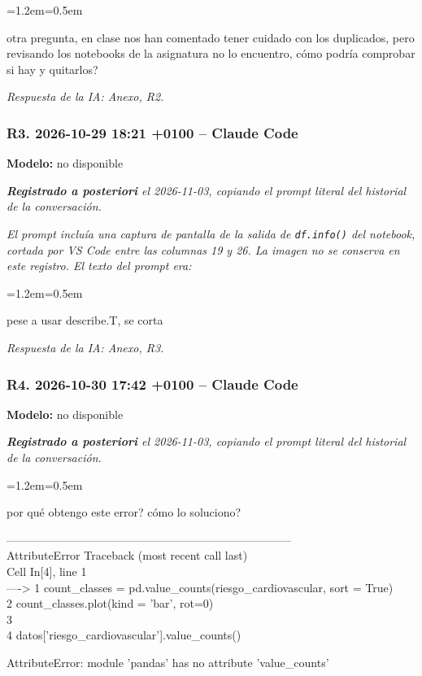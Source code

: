 \documentclass[11pt,a4paper]{article}
\newenvironment{prompt}
  {\par\smallskip\begin{list}{}{\leftmargin=1.2em\rightmargin=0.5em}\item\relax\small\color{black!80}}
  {\end{list}\smallskip}
\begin{document}
\begin{prompt}
otra pregunta, en clase nos han comentado tener cuidado con los duplicados, pero revisando los notebooks de la asignatura no lo encuentro, cómo podría comprobar si hay y quitarlos?
\end{prompt}

\textit{Respuesta de la IA: Anexo, R2.}

\subsubsection*{R3. 2026-10-29 18:21 +0100 -- Claude Code}
\textbf{Modelo:} no disponible

\textit{\textbf{Registrado a posteriori} el 2026-11-03, copiando el prompt literal del historial de la conversación.}

\textit{El prompt incluía una captura de pantalla de la salida de \texttt{df.info()} del notebook, cortada por VS Code entre las columnas 19 y 26. La imagen no se conserva en este registro. El texto del prompt era:}

\begin{prompt}
pese a usar describe.T, se corta
\end{prompt}

\textit{Respuesta de la IA: Anexo, R3.}

\subsubsection*{R4. 2026-10-30 17:42 +0100 -- Claude Code}
\textbf{Modelo:} no disponible

\textit{\textbf{Registrado a posteriori} el 2026-11-03, copiando el prompt literal del historial de la conversación.}

\begin{prompt}
por qué obtengo este error? cómo lo soluciono?

--------------------------------------------------------------------------- \\{}
AttributeError                            Traceback (most recent call last) \\{}
Cell In[4], line 1 \\{}
----\textgreater{} 1 count\_\allowbreak{}classes = pd.value\_\allowbreak{}counts(riesgo\_\allowbreak{}cardiovascular, sort = True) \\{}
      2 count\_\allowbreak{}classes.plot(kind = 'bar', rot=0) \\{}
      3 \\{}
      4 datos['riesgo\_\allowbreak{}cardiovascular'].value\_\allowbreak{}counts()

AttributeError: module 'pandas' has no attribute 'value\_\allowbreak{}counts'
\end{prompt}
\end{document}
